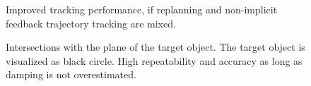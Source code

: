 \begin{figure}
	\centering
	
	\caption{Improved tracking performance, if replanning and non-implicit feedback trajectory tracking are mixed.}
\end{figure}

\begin{figure}
	\centering
	
	\caption{Intersections with the plane of the target object. The target object is visualized as black circle. High repeatability and accuracy as long as damping is not overestimated.}
\end{figure}

\begin{figure}
	\centering
\end{figure}


